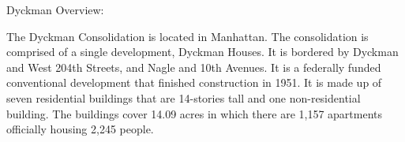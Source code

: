 Dyckman Overview: 

  

The Dyckman Consolidation is located in Manhattan. The consolidation is comprised of a single development, Dyckman Houses. It is bordered by Dyckman and West 204th Streets, and Nagle and 10th Avenues. It is a federally funded conventional development that finished construction in 1951. It is made up of seven residential buildings that are 14-stories tall and one non-residential building. The buildings cover 14.09 acres in which there are 1,157 apartments officially housing 2,245 people.